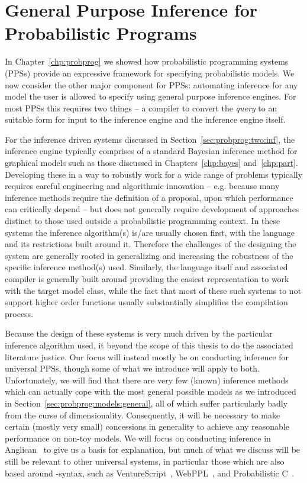 
\chapter{General Purpose Inference for Probabilistic Programs}
\label{chp:proginf}

In Chapter~\ref{chp:probprog} we showed how probabilistic programming systems (PPSs) provide
an expressive framework for specifying probabilistic models.  We now consider the other major component
for PPSs: automating inference for any model the user is allowed to specify using general purpose
inference engines.  For most PPSs this requires two things --  a compiler to convert the \emph{query} to an
suitable form for input to the inference engine and the inference engine itself.  

For the inference
driven systems discussed in Section~\ref{sec:probprog:two:inf}, the inference engine typically comprises of
a standard Bayesian inference method for graphical models such as those discussed in Chapters~\ref{chp:bayes}
and~\ref{chp:part}.  Developing these in a way to robustly work for a wide range of problems typically
requires careful engineering and algorithmic innovation -- e.g. because many inference methods require the definition of
a proposal, upon which performance can critically depend -- but does not generally require development 
of approaches distinct to those used outside a probabilistic programming context.  In these 
systems the inference algorithm(s) is/are usually chosen first, with the language and its restrictions built around it.
Therefore the challenges of the designing the system are generally rooted in generalizing and increasing the robustness of the 
specific inference method(s) used.  Similarly, the language itself and associated compiler is generally built
around providing the easiest representation to work with the target model class, while the fact that most of
these such systems to not support higher order functions usually substantially simplifies the compilation
process.

Because the design of these systems is very much driven by the particular inference algorithm used, it
beyond the scope of this thesis to do the associated literature justice.  Our focus will instead mostly be on 
conducting inference for universal PPSs, though some of what we introduce will apply to both.
Unfortunately, we will find that there are very few (known) inference
methods which can actually cope with the most general possible models as we introduced in
Section~\ref{sec:probprog:models:general}, all of which suffer particularly badly from the curse of
dimensionality.  Consequently, it will be necessary to make certain (mostly very small) concessions in 
generality to achieve any reasonable performance on non-toy models.  We will focus on conducting
inference in Anglican~\citep{wood2014new} to give us a basis for explanation, but much of
what we discuss will be still be relevant to other universal systems, in particular those which
are also based around \sample-\observe syntax, such as VentureScript~\citep{mansinghka2014venture}, 
WebPPL~\citep{goodman_book_2014}, and Probabilistic C~\citep{paige2014compilation}.

